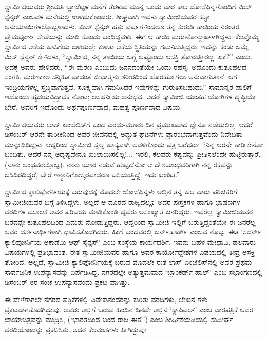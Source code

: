 ಸ್ವಾಮೀಜಿಯವರು ಶ್ರೀಮತಿ ಬ್ಲಾಜೆಟ್ಟಳ ಮನೆಗೆ ತೆರಳುವ ಮುನ್ನ ಒಂದು ವಾರ ಕಾಲ ಜೋಸೆಫಿನ್ನಳೊಂದಿಗೆ ಮಿಸ್ ಸ್ಪೆನ್ಸರ್ ಎಂಬವಳ ಮನೆಯಲ್ಲಿ ಉಳಿದುಕೊಂಡರು. ಶೀಘ್ರವಾಗಿ ಇವಳು ಸ್ವಾಮೀಜಿಯವರ ಕಟ್ಟಾ ಅನುಯಾಯಿಗಳಲ್ಲೊಬ್ಬಳಾದಳು. ಮಿಸ್ ಸ್ಪೆನ್ಸರ್ ಹತ್ತು ವರ್ಷಗಳಿಂದಲೂ ತನ್ನ ಕುರುಡಿ ತಾಯಿಯ ನಿರಂತರ ಪ್ರೇಮಪೂರ್ಣ ಸೇವೆಯನ್ನು ಮಾಡಿ ಕೊಂಡು ಬಂದಿದ್ದವಳು. ಈಗ ಆ ತಾಯಿ ಮರುಣೋನ್ಮುಖಳಾಗಿದ್ದಳು. ಕೆಲವೊಮ್ಮೆ ಸ್ವಾಮೀಜಿ ಆಕೆಯ ಹಾಸಿಗೆಯ ಬಳಿಯಲ್ಲೇ ಕುಳಿತು ಆಕೆಯ ಸ್ಥಿತಿಯನ್ನು ಗಮನಿಸುತ್ತಿದ್ದರು. ಇದನ್ನು ಕಂಡು ಒಮ್ಮೆ ಮಿಸ್ ಸ್ಪೆನ್ಸರ್ ಕೇಳಿದಳು, “ಸ್ವಾಮೀಜಿ, ನನ್ನ ತಾಯಿಯ ಬಗ್ಗೆ ಅಷ್ಟೊಂದು ಆಸಕ್ತಿ ತೋರುತ್ತೀರಲ್ಲ, ಏಕೆ?” ಎಂದು. ಅದಕ್ಕೆ ಅವರು ಹೇಳಿದರು, “ಈ ಮರಣ ಎಂಬುದು ಜನನದಂತೆಯೇ ಒಂದು ರಹಸ್ಯ; ಅದೊಂದು ಕುತೂಹಲದ ಸಂಗತಿ. ಮರಣಕಾಲ ಸನ್ನಿಹಿತ ವಾದಂತೆ ಜೀವಾತ್ಮನು ಶರೀರದಿಂದ ಹೊರಹೋಗಲು ಅನುವಾಗುತ್ತಾನೆ. ಆಗ ಇಂದ್ರಿಯಗಳೆಲ್ಲ ಸ್ತಬ್ಧವಾಗುತ್ತವೆ. ಸೂಕ್ಷ್ಮವಾಗಿ ಗಮನಿಸಿದರೆ ಇವುಗಳನ್ನು ಗುರುತಿಸಬಹುದು.” ಸಾಮಾನ್ಯರ ಪಾಲಿಗೆ ಇದೊಂದು ಹೃದಯವಿದ್ರಾವಕ ನೋಟ; ಅಸಹನೀಯ ಅನುಭವ. ಆದರೆ ಸ್ವಾಮೀಜಿ ಯಂತಹ ಯೋಗಿಗಳ ದೃಷ್ಟಿಯೇ ಬೇರೆ. ಅವರಿಗೆ ಇದೊಂದು ಅರ್ಥಪೂರ್ಣವಾದ, ಮಹತ್ವ ಪೂರ್ಣವಾದ ವಿಷಯ.

ಸ್ವಾಮೀಜಿಯವರು ಲಾಸ್ ಏಂಜೆಲಿಸ್​ಗೆ ಬಂದ ಎರಡು-ಮೂರು ದಿನ ಪ್ರಮುಖವಾದ ದ್ದೇನೂ ನಡೆಯಲಿಲ್ಲ. ಆದರೆ ಡಿಸೆಂಬರ್ ಆರನೇ ತಾರೀಕಿನಿಂದ ಅವರ ಜೀವನದಲ್ಲಿ ಅದ್ಭುತ ಘಟನೆಗಳು ಪ್ರಾರಂಭವಾಗುತ್ತವೆಂದು ನಿವೇದಿತಾ ಮುನ್ನುಡಿದಿದ್ದಳು. ಆದ್ದರಿಂದ ಸ್ವಾಮೀಜಿ ಸ್ವಲ್ಪ ಹಾಸ್ಯವಾಗಿ ಅವಳಿಗೊಂದು ಪತ್ರ ಬರೆದರು: “ನಿನ್ನ ಆರನೇ ತಾರೀಕೇನೋ ಬಂದಿತು. ಆದರೆ ನನ್ನ ಅದೃಷ್ಟವೇನೂ ಖುಲಾಯಿಸಲಿಲ್ಲ!... ಇರಲಿ, ಕೆಲವರು ಕಷ್ಟವನ್ನು ಪ್ರೀತಿಸಲೆಂದೇ ಹುಟ್ಟಿರುತ್ತಾರೆ. (ನಾನು ಅಂಥವರಲ್ಲೊಬ್ಬ). ನಾನು ಯಾರ ನಡುವೆ ಹುಟ್ಟಿದೆನೋ ಆ ದೇಶಬಾಂಧವರಿಗಾಗಿ ನನ್ನ ರಕ್ತವನ್ನು ಬಸಿದಿರದಿದ್ದರೆ, ಬೇರೆ ಇನ್ಯಾರಿಗೋಸ್ಕರವಾದರೂ ಬಸಿಯುತ್ತಿದ್ದೆ. ಇದು ಖಂಡಿತ.”

ಸ್ವಾಮೀಜಿ ಕ್ಯಾಲಿಫೋರ್ನಿಯಕ್ಕೆ ಬರುವುದಕ್ಕೆ ಮೊದಲೇ ಜೋಸೆಫಿನ್ನಳು ಅಲ್ಲಿನ ತನ್ನ ಹಲ ವಾರು ಪರಿಚಿತರಿಗೆ ಸ್ವಾಮೀಜಿಯವರ ಬಗ್ಗೆ ತಿಳಿಸಿದ್ದಳು. ಅಲ್ಲದೆ ಆ ದೂರದ ರಾಜ್ಯದಲ್ಲೂ ಅವರ ಪುಸ್ತಕಗಳ ಹಾಗೂ ಭಾಷಣಗಳ ವರದಿಗಳ ಮೂಲಕ ಅವರ ಪರಿಚಯ ಮಾಡಿಕೊಂಡಿ ದ್ದವರು ಅಸಂಖ್ಯಾತ ಜನರಿದ್ದರು. ಇವರೆಲ್ಲ ಸ್ವಾಮೀಜಿಯವರ ಬರವನ್ನೇ ಕುತೂಹಲದಿಂದ ಎದುರು ನೋಡುತ್ತಿದ್ದರು. ಆದ್ದರಿಂದ ಸ್ವಾಮೀಜಿ ಇಲ್ಲಿಗೆ ಬರುತ್ತಿದ್ದಂತೆಯೇ ಈ ಜನರೆಲ್ಲ ಅವರ ದರ್ಶನಾರ್ಥಿಗಳಾಗಿ ಧಾವಿಸತೊಡಗಿದರು. ಹೀಗೆ ಬಂದವರಲ್ಲಿ ಬರ್ನ್​ಹಾರ್ಡ್ ಎಂಬವ ನೊಬ್ಬ. ಈತ ‘ಸದರ್ನ್ ಕ್ಯಾಲಿಫೋರ್ನಿಯ ಅಕಾಡೆಮಿ ಆಫ್ ಸೈನ್ಸಸ್​’ ಎಂಬ ಸಂಸ್ಥೆಯ ಕಾರ್ಯದರ್ಶಿ. ಇವನು ಬಹಳ ಮೇಧಾವಿ, ಹಲವಾರು ವಿಷಯಗಳಲ್ಲಿ ಪ್ರತಿಭಾವಂತ. ಈತ ಸ್ವಾಮೀಜಿಯವರ ಹಾಗೂ ಅವರ ಕಾರ್ಯೋದ್ದೇಶಗಳ ವಿಷಯದಲ್ಲಿ ತೀವ್ರ ಆಸಕ್ತಿ ತೋರಿದ. ಅಲ್ಲದೆ, ಸ್ವಾಮೀಜಿ ಕ್ಯಾಲಿಫೋರ್ನಿಯಕ್ಕೆ ಬರುವ ಮೊದಲೇ ಈತ ಲಾಸ್ ಏಂಜೆಲಿಸ್​ನಲ್ಲಿ ಅವರ ಪ್ರಥಮ ಸಾರ್ವಜನಿಕ ಉಪನ್ಯಾಸವನ್ನು ಏರ್ಪಡಿಸಿದ್ದ. ನಗರದಲ್ಲೇ ಅತ್ಯುತ್ತಮವಾದ ‘ಬ್ಲಾಂಕರ್ಡ್ ಹಾಲ್​’ ಎಂಬ ಸಭಾಂಗಣದಲ್ಲಿ ಡಿಸೆಂಬರ್ ೮ರ ಸಂಜೆ ಉಪನ್ಯಾಸವೆಂದು ಪ್ರಕಟ ವಾಗಿತ್ತು.

ಈ ವೇಳೆಗಾಗಲೇ ನಗರದ ಪತ್ರಿಕೆಗಳಲ್ಲಿ ವಿವೇಕಾನಂದರನ್ನು ಕುರಿತು ವರದಿಗಳು, ಲೇಖನ ಗಳು ಪ್ರಕಟವಾಗತೊಡಗಿದ್ದುವು. ಅವರು ಅಲ್ಲಿಗೆ ಬರುವ ಹಿಂದಿನ ದಿನವೇ ಅಲ್ಲಿನ ‘ಕ್ಯಾಪಿಟಲ್​’ ಎಂಬ ವಾರಪತ್ರಿಕೆ ಅವರ ಛಾಯಾಚಿತ್ರವನ್ನು ಮುದ್ರಿಸಿ,  (‘ಭಾರತದಿಂದ ಬಂದ ರಾಜ ಈತ!’) ಎಂಬ ಶೀರ್ಷಿಕೆಯಡಿಯಲ್ಲಿ ಸುದೀರ್ಘ ವರದಿಯೊಂದನ್ನು ಪ್ರಕಟಿಸಿತು. ಅದರ ಕೆಲವಂಶಗಳು ಹೀಗಿದ್ದುವು:

